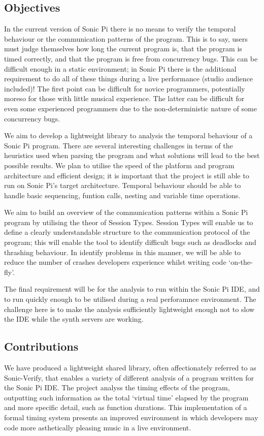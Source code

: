 \documentclass[11pt, abstracton, twoside, titlepage=true]{scrartcl}
\begin{document}
\subsection{Objectives}
In the current version of Sonic Pi \cite{sp} there is no means to verify the 
temporal behaviour or the communication patterns of the program. This is to say, 
users must judge themselves how long the current program is, that the program is 
timed correctly, and that the program is free from concurrency bugs. This can be 
difficult enough in a static environment; in Sonic Pi there is the additional 
requirement to do all of these things during a live performance (studio audience 
included)! The first point can be difficult for novice programmers, potentially 
moreso for those with little musical experience. The latter can be difficult for 
even some experienced programmers due to the non-deterministic nature of some 
concurrency bugs.

We aim to develop a lightweight library to analysis the temporal behaviour of a 
Sonic Pi program. There are several interesting challenges in terms of 
the heuristics used when parsing the program and what solutions will lead to the 
best possible results. We plan to utilise the speed of the platform and program 
architecture and efficient design; it is important that the project is still 
able to run on Sonic Pi's target architecture. Temporal behaviour should be able 
to handle basic sequencing, funtion calls, nesting and variable time operations. 

We aim to build an overview of the communication patterns within a Sonic Pi program 
by utilising the theor of Session Types. Session Types will
enable us to define a clearly understandable structure to the communication
protocol of the program; this will enable the tool to identify difficult bugs
such as deadlocks and thrashing behaviour. In identify problems in this manner,
we will be able to reduce the number of crashes developers experience whilst 
writing code `on-the-fly'. 

The final requirement will be for the analysis to run within the Sonic Pi IDE, 
and to run quickly enough to be utilised during a real perforamnce environment. 
The challenge here is to make the analysis sufficiently lightweight enough not to
slow the IDE while the synth servers are working. 

\subsection{Contributions}
We have produced a lightweight shared library, often affectionately referred to 
as Sonic-Verify, that enables a variety of different analysis of a program 
written for the Sonic Pi IDE. The project analyss the timing effects of the 
program, outputting such information as the total `virtual time' elapsed by the 
program and more specific detail, such as function durations. This implementation
of a formal timing system presents an improved environment in which developers
may code more asthetically pleasing music in a live environment.
\end{document}
